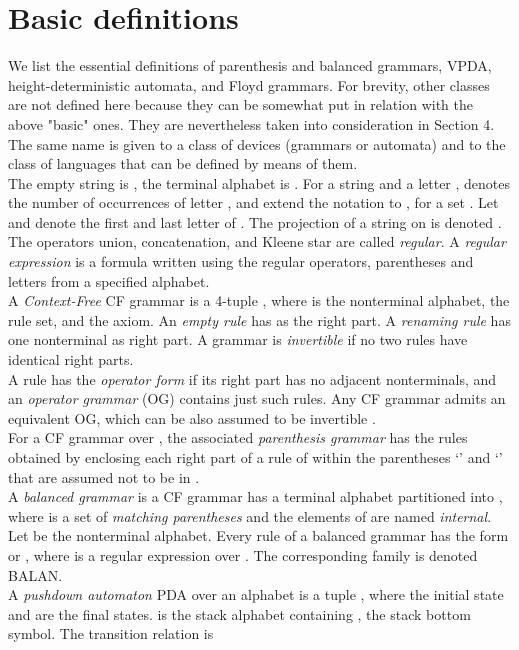 \documentclass[3p,11pt]{elsarticle}
\begin{document}
\section{Basic definitions}\label{SectBasicDef}
We list the essential definitions of parenthesis and balanced grammars, VPDA, height-deterministic automata, and Floyd grammars. For brevity, other classes are not defined here because they can be somewhat put in relation with the above "basic" ones. They are nevertheless taken into consideration in Section 4. The same name is given to a class of devices (grammars or automata) and to the class of languages that can be defined by means of them.
\\
The empty string is , the terminal alphabet is . For a string  and a letter ,  denotes the number of occurrences of letter , and extend the notation to , for a set . Let  and  denote the first and last letter of . The projection of a string  on  is denoted .
\\
The operators union, concatenation, and Kleene star are called \emph{regular}. A \emph{regular expression} is a formula written using the regular operators, parentheses and letters from a specified alphabet.
\\
A \emph{Context-Free} CF grammar is  a 4-tuple , where  is the nonterminal alphabet,  the rule set, and  the axiom. An \emph{empty rule} has  as the right part. A \emph{renaming rule} has one nonterminal as right part. A grammar is \emph{invertible} if no two rules have identical right parts.
\\
A rule has the \emph{operator form} if its right part has no adjacent nonterminals, and an \emph{operator grammar} (OG) contains just such rules. Any CF grammar admits an equivalent OG, which can be also assumed to be invertible \cite{Harrison78}.
\\
For a CF grammar  over ,  the associated \emph{parenthesis grammar} \cite{McNaughton67}   has the rules  obtained by enclosing each right part of a rule of  within the parentheses `' and `' that are assumed not to be in .
\\
A \emph{balanced grammar} \cite{Berstel:2001:BGT} is a CF grammar  has a terminal alphabet partitioned into , where  is a set of \emph{matching parentheses} and the elements of  are named \emph{internal}. Let  be the nonterminal alphabet. Every rule of a balanced grammar has the form  or , where  is a regular expression over . The corresponding family is denoted BALAN.
\\
A \emph{pushdown automaton} PDA  over an alphabet  is a tuple , where the initial state  and  are the final states.  is the stack alphabet containing , the stack bottom symbol. The transition relation is
\\
\end{document}

